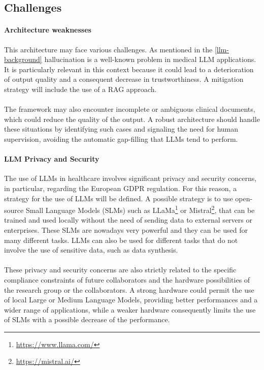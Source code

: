 \documentclass{scrartcl}
\begin{document}
\subsection{Challenges}
\paragraph{Architecture weaknesses}{
This architecture may face various challenges. As mentioned in the \cref{llm-background} hallucination is a well-known problem in medical LLM applications. It is particularly relevant in this context because it could lead to a deterioration of output quality and a consequent decrease in trustworthiness. 
A mitigation strategy will include the use of a RAG approach.
\\\\
The framework may also encounter incomplete or ambiguous clinical documents, which could reduce the quality of the output. A robust architecture should handle these situations by identifying such cases and signaling the need for human supervision, avoiding the automatic gap-filling that LLMs tend to perform. 
}

\paragraph{LLM Privacy and Security}{The use of LLMs in healthcare involves significant privacy and security concerns, in particular, regarding the European GDPR regulation.
For this reason, a strategy for the use of LLMs will be defined. A possible strategy is to use open-source Small Language Models (SLMs) such as LLaMa\footnote{\url{https://www.llama.com/}} or Mistral\footnote{\url{https://mistral.ai/}}, that can be trained and used locally without the need of sending data to external servers or enterprises. These SLMs are nowadays very powerful and they can be used for many different tasks. LLMs can also be used for different tasks that do not involve the use of sensitive data, such as data synthesis.
\\\\
These privacy and security concerns are also strictly related to the specific compliance constraints of future collaborators and the hardware possibilities of the research group or the collaborators. A strong hardware could permit the use of local Large or Medium Language Models, providing better performances and a wider range of applications, while a weaker hardware consequently limits the use of SLMs with a possible decrease of the performance. }
\end{document}
